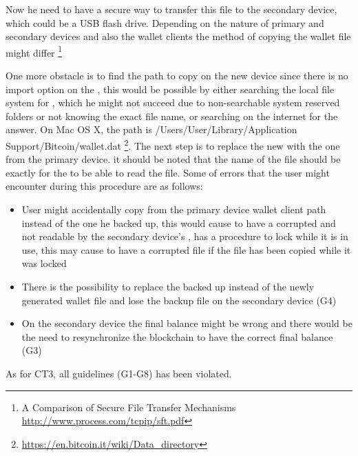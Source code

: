 Now he need to have a secure way to transfer this file to the secondary device, which could be a USB flash drive. Depending on the nature of primary and secondary devices and also the wallet clients the method of copying the wallet file might differ \footnote{A Comparison of Secure File Transfer Mechanisms \url{http://www.process.com/tcpip/sft.pdf}}


One more obstacle is to find the path to copy \walletfile on the new device since there is no import option on the \bitcoinclient, this would be possible by either searching the local file system for \walletfile, which he might not succeed due to non-searchable system reserved folders or not knowing the exact file name, or searching on the internet for the answer. On Mac OS X, the path is /Users/User/Library/Application Support/Bitcoin/wallet.dat \footnote{\url{https://en.bitcoin.it/wiki/Data_directory}}. The next step is to replace the new \walletfile with the one from the primary device. it should be noted that the name of the file should be exactly \walletfile for the \bitcoinclient to be able to read the file. Some of errors that the user might encounter during this procedure are as follows:
\begin{itemize}
	\item User might accidentally copy \walletfile from the primary device wallet client path instead of the one he backed up, this would cause to have a corrupted \walletfile and not readable by the secondary device's \bitcoinclient, \bitcoinclient has a procedure to lock \walletfile while it is in use, this may cause to have a corrupted file if the file has been copied while it was locked %
	\item There is the possibility to replace the backed up \walletfile instead of the newly generated wallet file and lose the backup file on the secondary device (G4)
	\item On the secondary device the final balance might be wrong and there would be the need to resynchronize the blockchain to have the correct final balance (G3)
\end{itemize}
As for CT3, all guidelines (G1-G8) has been violated.\

